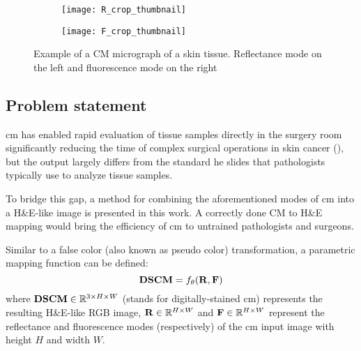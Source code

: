\documentclass[../main.tex]{subfiles}
\begin{document}
\begin{figure}[h]
\centering
\begin{subfigure}{.5\textwidth}
  \centering
  \texttt{[image: R\_crop\_thumbnail]}
  \label{fig:R-example}
\end{subfigure}%
\begin{subfigure}{.5\textwidth}
  \centering
  \texttt{[image: F\_crop\_thumbnail]}
  \label{fig:F-example}
\end{subfigure}
\caption{Example of a CM micrograph of a skin tissue.
Reflectance mode on the left and fluorescence mode on the right}
\label{fig:CM-example}
\end{figure}

\subsection{Problem statement}
\label{sec:problem-statement}
\gls{cm} has enabled rapid evaluation of tissue samples
directly in the surgery room significantly reducing the time of complex
surgical operations in skin cancer (\cite{Cinotti2018}),
but the output largely differs from the standard \gls{he} slides that
pathologists typically use to analyze tissue samples.

To bridge this gap, a method for combining the aforementioned modes of
\gls{cm} into a H\&E-like image is presented in this work.
A correctly done CM to H\&E mapping would bring the efficiency of \gls{cm}
to untrained pathologists and surgeons.

Similar to a false color (also known as pseudo color) transformation,
a parametric mapping function can be defined:
\begin{equation} \label{eq:mapping-function}
	\mathbf{DSCM}
	= f_{\theta}(\mathbf{R}, \mathbf{F})
\end{equation}
where $\mathbf{DSCM} \in \mathbb{R}{}^{3 \times H \times W}$ (stands for digitally-stained
\gls{cm}) represents the resulting H\&E-like RGB image,
$\mathbf{R} \in \mathbb{R}{}^{H \times W}$ and $\mathbf{F} \in \mathbb{R}{}^{H \times W}$
represent the reflectance and fluorescence modes (respectively) of the \gls{cm} input
image with height $H$ and width $W$.
\end{document}
